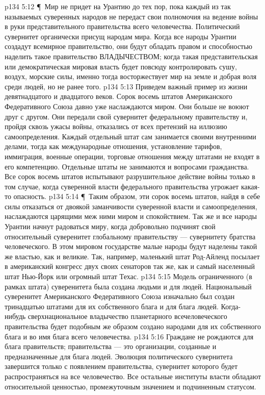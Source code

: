 \vs p134 5:12 \P\ Мир не придет на Урантию до тех пор, пока каждый из так называемых суверенных народов не передаст свои полномочия на ведение войны в руки представительного правительства всего человечества. Политический сувернитет органически присущ народам мира. Когда все народы Урантии создадут всемирное правительство, они будут обладать правом и способностью наделить такое правительство ВЛАДЫЧЕСТВОМ; когда такая представительская или демократическая мировая власть будет повсюду контролировать сушу, воздух, морские силы, именно тогда восторжествует мир на земле и добрая воля среди людей, но не ранее того.
\vs p134 5:13 Приведем важный пример из жизни девятнадцатого и двадцатого веков. Сорок восемь штатов Американского Федеративного Союза давно уже наслаждаются миром. Они больше не воюют друг с другом. Они передали свой сувернитет федеральному правительству и, пройдя сквозь ужасы войны, отказались от всех претензий на иллюзию самоопределения. Каждый отдельный штат сам занимается своими внутренними делами, тогда как международные отношения, установление тарифов, иммиграция, военные операции, торговые отношения между штатами не входят в его компетенцию. Отдельные штаты не занимаются и вопросами гражданства. Все сорок восемь штатов испытывают разрушительное действие войны только в том случае, когда суверенной власти федерального правительства угрожает какая\hyp{}то опасность.
\vs p134 5:14 \P\ Таким образом, эти сорок восемь штатов, найдя в себе силы отказаться от двоякой заманчивости суверенной власти и самоопределения, наслаждаются царящими меж ними миром и спокойствием. Так же и все народы Урантии начнут радоваться миру, когда добровольно подчинят свой относительный суверенитет глобальному правительству --- сувернитету братства человеческого. В этом мировом государстве малые народы будут наделены такой же властью, как и великие. Так, например, маленький штат Род\hyp{}Айленд посылает в американский конгресс двух своих сенаторов так же, как и самый населенный штат Нью\hyp{}Йорк или огромный штат Техас.
\vs p134 5:15 Модель ограниченного (в рамках штата) суверенитета была создана людьми и для людей. Национальный суверенитет Американского Федеративного Союза изначально был создан тринадцатью штатами для их собственного блага и для блага людей. Когда\hyp{}нибудь сверхнациональное владычество планетарного всечеловеческого правительства будет подобным же образом создано народами для их собственного блага и во имя блага всего человечества.
\vs p134 5:16 Граждане не рождаются для блага правительств; правительства --- это организации, созданные и предназначенные для блага людей. Эволюция политического сувернитета завершится только с появлением правительства, сувернитет которого будет распространяться на все человечество. Все остальные институты власти обладают относительной ценностью, промежуточным значением и подчиненным статусом.
